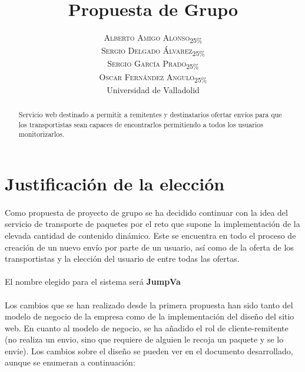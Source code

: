 \documentclass[10pt, a4paper,spanish]{article}
\title{\vspace{-15mm}\fontsize{24pt}{10pt}\selectfont\textbf{Propuesta de Grupo}} %
\author{
\large
\textsc{Alberto Amigo Alonso\textsubscript{25\%}}\\[2mm] %
\textsc{Sergio Delgado Álvarez\textsubscript{25\%}}\\[2mm] %
\textsc{Sergio García Prado\textsubscript{25\%}}\\[2mm] %
\textsc{Oscar Fernández Angulo\textsubscript{25\%}}\\[2mm] %
\normalsize Universidad de Valladolid \\ %
\vspace{-5mm}
}
\date{}
\begin{document}
	\maketitle %

	\thispagestyle{fancy} %


	\begin{abstract}
		\noindent Servicio web destinado a permitir a remitentes y destinatarios ofertar envíos para que los transportistas sean capaces de encontrarlos permitiendo a todos los usuarios monitorizarlos.
	\end{abstract}

		\section{Justificación de la elección}

			\paragraph{}
			Como propuesta de proyecto de grupo se ha decidido continuar con la idea del servicio de transporte de paquetes por el reto que supone la implementación de la elevada cantidad de contenido dinámico. Este se encuentra en todo el proceso de creación de un nuevo envío por parte de un usuario, así como de la oferta de los transportistas y la elección del usuario de entre todas las ofertas.

			\paragraph{}
			El nombre elegido para el sistema será \textbf{JumpVa}

			\paragraph{}
			Los cambios que se han realizado desde la primera propuesta han sido tanto del modelo de negocio de la empresa como de la implementación del diseño del sitio web. En cuanto al modelo de negocio, se ha añadido el rol de cliente-remitente (no realiza un envio, sino que requiere de alguien le recoja un paquete y se lo envie). Los cambios sobre el diseño se pueden ver en el documento desarrollado, aunque se enumeran a continuación:
\end{document}
